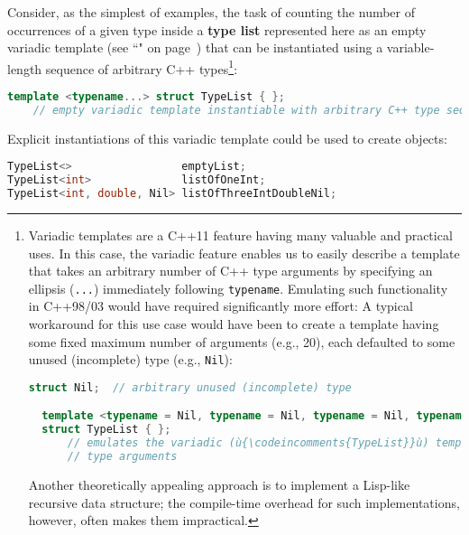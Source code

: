 Consider, as the simplest of examples, the task of counting the number
of occurrences of a given type inside a \textbf{type list} represented
here as an empty variadic template (see ``" on page~\pageref{variadictemplate}) that can be
instantiated using a variable-length sequence of arbitrary C++ types{\cprotect\footnote{Variadic templates are a C++11
  feature having many valuable and practical uses. In this case, the
  variadic feature enables us to easily describe a template that takes
  an arbitrary number of C++ type arguments by specifying an ellipsis
  (\texttt{...}) immediately following \texttt{typename}. Emulating such
  functionality in C++98/03 would have required significantly more
  effort: A typical workaround for this use case would have been to
  create a template having some fixed maximum number of arguments (e.g.,
  20), each defaulted to some unused (incomplete) type (e.g.,
  \texttt{Nil}):

  \begin{lstlisting}[language=C++, basicstyle={\ttfamily\footnotesize}]
  struct Nil;  // arbitrary unused (incomplete) type

  template <typename = Nil, typename = Nil, typename = Nil, typename = Nil>
  struct TypeList { };
      // emulates the variadic (ù{\codeincomments{TypeList}}ù) template (ù{\codeincomments{struct}}ù) for up to four
      // type arguments
  \end{lstlisting}

\vspace*{-1ex}
\noindent Another theoretically appealing approach is to implement a Lisp-like
  recursive data structure; the compile-time overhead for such
  implementations, however, often makes them impractical.}}:

\begin{lstlisting}[language=C++]
template <typename...> struct TypeList { };
    // empty variadic template instantiable with arbitrary C++ type sequence
\end{lstlisting}

\noindent Explicit instantiations of this variadic template could be used to
create objects:

\begin{lstlisting}[language=C++]
TypeList<>                 emptyList;
TypeList<int>              listOfOneInt;
TypeList<int, double, Nil> listOfThreeIntDoubleNil;
\end{lstlisting}

